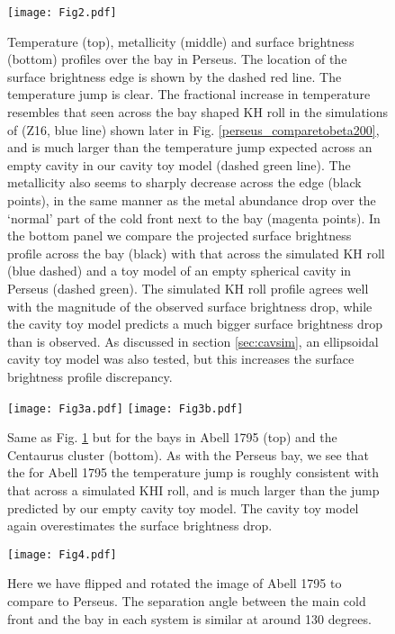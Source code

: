 \documentclass[useAMS,usenatbib]{mn2e}
\begin{document}
\begin{figure}
  \begin{center}
    \leavevmode
\texttt{[image: Fig2.pdf]}
      \caption{Temperature (top), metallicity (middle) and surface brightness
(bottom) profiles over the bay in Perseus. The location of the surface
brightness edge is shown by the dashed red line. The
temperature jump is clear. The fractional increase in
temperature resembles that seen across the bay shaped KH roll in the simulations
of \citet{ZuHone2016}
(Z16, blue line) shown later in Fig. \ref{perseus_comparetobeta200}, and is much larger than the temperature jump expected across an empty cavity in our cavity toy model (dashed green line).
 The metallicity also seems to sharply decrease across the edge (black points), in the same 
manner as the metal abundance drop over the `normal' part of the cold front next to the bay (magenta points). In
the bottom panel we compare
the projected surface brightness profile across the bay (black) with that across
the simulated KH roll (blue dashed) and a toy model of an empty spherical cavity in Perseus
(dashed green). The simulated KH roll profile agrees well with the magnitude of the observed
surface brightness drop, while the cavity toy model predicts a much bigger
surface brightness drop than is observed. As discussed in section \ref{sec:cavsim}, an ellipsoidal cavity toy model was also tested, but this increases the surface brightness profile discrepancy. }
      \label{Temperatures_finebayedge}
  \end{center}
\end{figure}

\begin{figure}
  \begin{center}
    \leavevmode
    \vbox{
\texttt{[image: Fig3a.pdf]}
\texttt{[image: Fig3b.pdf]}
}
      \caption{Same as Fig. \ref{Temperatures_finebayedge} but for the bays in Abell 1795
(top) and the Centaurus cluster (bottom). As with the Perseus bay, we see that the for Abell 1795 
the temperature jump is roughly consistent with that across a simulated KHI roll, and is much larger than the jump 
predicted by our empty cavity toy model. The cavity toy model again overestimates the surface brightness drop.   }
      \label{Temperatures_finebayedgeA1795andCen}
  \end{center}
\end{figure}

\begin{figure}
  \begin{center}
    \leavevmode
\texttt{[image: Fig4.pdf]}
      \caption{Here we have flipped and rotated the image of Abell 1795 to compare to Perseus. The separation angle 
between the main cold front and the bay in each system is similar at around 130 degrees.  }
      \label{Compare_Perseus_A1795rot}
  \end{center}
\end{figure}
\end{document}
